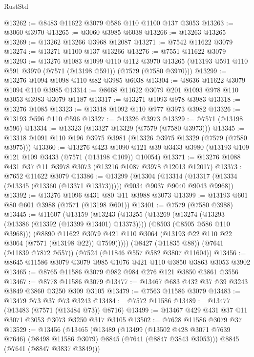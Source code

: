 \begin{lexlean}{RustStd}
\begin{coremodule}
{\begin{coremodule}
{{{{{{{{{{{{{{{{{{{{{{{{{{{{{{{{@13262 := @8483 @11622 @3079 @586 @110 @1100 @137 @3053
@13263 := @3060 @3970
@13265 := @3060 @3985 @6038
@13266 := @13263 @13265
@13269 := @13262 @13266 @3968 @12087
@13271 := @7542 @11622 @3079
@13274 := @13271 @1100 @137 @13266
@13276 := @7551 @11622 @3079
@13293 := @13276
    @1083
    @1099
    @110
    @112
    @3970
    @13265
    (@13193 @591 @110 @591 @3970 (@7571 (@13198 @591)) (@7579 (@7580 @3970)))
@13299 := @13276 @1094 @1098 @110 @82 @3985 @6038
@13304 := @8636 @11622 @3079 @1094 @110 @3985
@13314 := @8668 @11622 @3079 @201 @1093 @978 @110 @3053 @3983 @3079 @1187
@13317 := @13271 @1093 @978 @3983
@13318 := @13276 @1085
@13323 := @13318 @1092 @110 @977 @3973 @3982
@13326 := @13193 @596 @110 @596
@13327 := @13326 @3973
@13329 := @7571 (@13198 @596)
@13334 := @13323 (@13327 @13329 (@7579 (@7580 @3973)))
@13345 := @13318 @1091 @110 @196 @3975 @3981 (@13326 @3975 @13329 (@7579 (@7580 @3975)))
@13360 := @13276
    @423
    @1090
    @121
    @39
    @3433
    @3980
    (@13193 @109 @121 @109 @3433 (@7571 (@13198 @109)) @10054)
@13371 := @13276 @1088 @431 @37 @11 @3978 @3073 (@13216 @1087 @3978 @12013 @12017)
@13373 := @7652 @11622 @3079
@13386 := @13299
    (@13304
      (@13314 (@13317 (@13334 (@13345 (@13360 (@13371 @13373))))) @9034 @9037 @9040 @9043 @9968))
@13392 := @13276 @1096 @431 @80 @11 @3988 @3073
@13399 := @13193 @601 @80 @601 @3988 (@7571 (@13198 @601))
@13401 := @7579 (@7580 @3988)
@13445 := @11607
    (@13159
      (@13243
        (@13255
          (@13269
            (@13274 (@13293 (@13386 (@13392 (@13399 @13401) @13373))))
            (@8503 (@8505 @586 @110 @3968)))
          (@8890
            @11622
            @3079
            @421
            @110
            @3064
            (@13193 @22 @110 @22 @3064 (@7571 (@13198 @22)) @7599)))))
    (@8427 (@11835 @88))
    (@7641 (@11839 @7872 @557))
    (@7524 (@11846 @557 @582 @3807 @11604))
@13456 := @8645 @11586 @3079 @3079 @985 @1076 @421 @110 @3850 @3863 @3053 @3902
@13465 := @8765 @11586 @3079 @982 @984 @276 @121 @3850 @3861 @3556
@13467 := @8778 @11586 @3079
@13477 := @13467 @683 @432 @37 @39 @3243 @3849 @3860 @3250 @309 @3105
@13479 := @7563 @11586 @3079
@13483 := @13479 @73 @37 @73 @3243
@13484 := @7572 @11586
@13489 := @13477 (@13483 (@7571 (@13484 @73)) @8716)
@13499 := @13467 @429 @431 @37 @11 @3071 @3053 @3073 @3250 @317 @3105
@13502 := @7628 @11586 @3079 @37
@13529 := @13456
    (@13465
      (@13489
        (@13499
          (@13502 @428 @3071 @7639 @7646)
          (@8498 @11586 @3079)
          @8845
          (@7641 (@8847 @3843 @3053)))
        @8845
        (@7641 (@8847 @3837 @3849)))
}}}}}}}}}}}}}}}}}}}}}}}}}}}}}}}}
\end{coremodule}}
\end{coremodule}
\end{lexlean}
